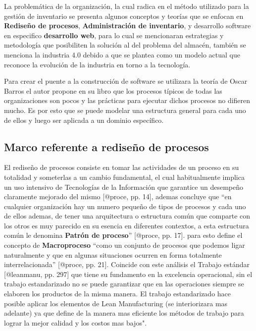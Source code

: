 \documentclass[
]{article}
\begin{document}
La problemática de la organización, la cual radica en el método
utilizado para la gestión de inventario se presenta algunos conceptos y
teorías que se enfocan en \textbf{Rediseño de procesos},
\textbf{Administración de inventario}, y desarrollo software en
especifico \textbf{desarrollo web}, para lo cual se mencionaran
estrategias y metodología que posibiliten la solución al del problema
del almacén, también se menciona la industria 4.0 debido a que se
plantea como un modelo actual que reconoce la evolución de la industria
en torno a la tecnología.

Para crear el puente a la construcción de software se utilizara la
teoría de Oscar Barros el autor propone en su libro que los procesos
típicos de todas las organizaciones son pocos y las prácticas para
ejecutar dichos procesos no difieren mucho. Es por esto que se puede
modelar una estructura general para cada uno de ellos y luego ser
aplicada a un dominio específico.

\hypertarget{marco-referente-a-rediseuxf1o-de-procesos}{%
\subsection{Marco referente a rediseño de
procesos}\label{marco-referente-a-rediseuxf1o-de-procesos}}

El rediseño de procesos consiste en tomar las actividades de un proceso
en su totalidad y someterlas a un cambio fundamental, el cual
habitualmente implica un uso intensivo de Tecnologías de la Información
que garantice un desempeño claramente mejorado del mismo {[}@proce, pp.
14{]}, ademas concluye que ``en cualquier organización hay un numero
pequeño de tipos de procesos y cada uno de ellos ademas, de tener una
arquitectura o estructura común que comparte con los otros es muy
parecido en su esencia en diferentes contextos, a esta estructura común
le denomina \textbf{Patrón de proceso}'' {[}@proce, pp. 17{]}. para esto
define el concepto de \textbf{Macroproceso} ``como un conjunto de
procesos que podemos ligar naturalmente y que en algunas situaciones
ocurren en forma totalmente interrelacionada'' {[}@proce, pp. 21{]}.
Coincide con este análisis el Trabajo estándar {[}@leanmanu, pp. 297{]}
que tiene su fundamento en la excelencia operacional, sin el trabajo
estandarizado no se puede garantizar que en las operaciones siempre se
elaboren los productos de la misma manera. El trabajo estandarizado hace
posible aplicar los elementos de Lean Manufacturing (se interiorizara
mas adelante) ya que define de la manera mas eficiente los métodos de
trabajo para lograr la mejor calidad y los costos mas bajos".
\end{document}
